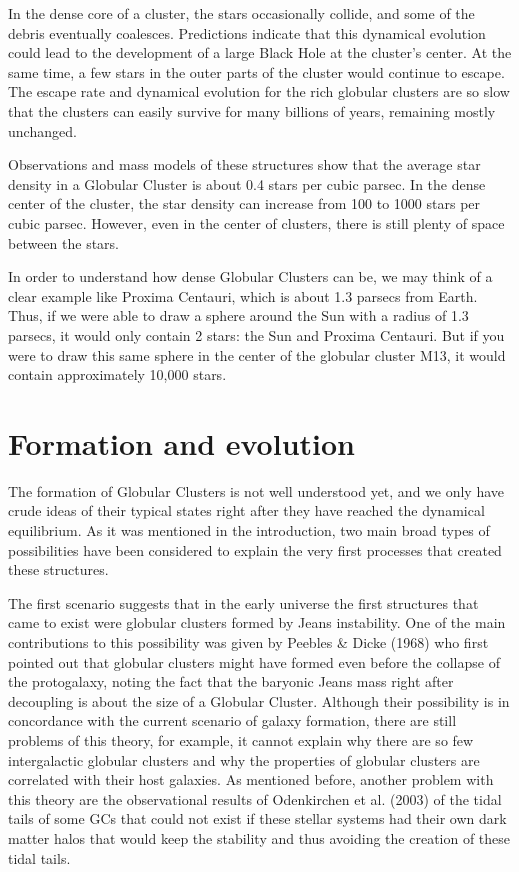 In the dense core of a cluster, the stars occasionally collide, and some of the debris eventually coalesces. Predictions indicate that this dynamical evolution could lead to the development of a large Black Hole at the cluster's center. At the same time, a few stars in the outer parts of the cluster would continue to escape. The escape rate and dynamical evolution for the rich globular clusters are so slow that the clusters can easily survive for many billions of years, remaining mostly unchanged.

Observations and mass models of these structures show that the average star density in a Globular Cluster is about 0.4 stars per cubic parsec. In the dense center of the cluster, the star density can increase from 100 to 1000 stars per cubic parsec. However, even in the center of clusters, there is still plenty of space between the stars.

In order to understand how dense Globular Clusters can be, we may think of a clear example like Proxima Centauri, which is about 1.3 parsecs from Earth. Thus, if we were able to draw a sphere around the Sun with a radius of 1.3 parsecs, it would only contain 2 stars: the Sun and Proxima Centauri. But if you were to draw this same sphere in the center of the globular cluster M13, it would contain approximately 10,000 stars.

\section{Formation and evolution}

The formation of Globular Clusters is not well understood yet, and we only have crude ideas of their typical states right after they have reached the dynamical equilibrium. As it was mentioned in the introduction, two main broad types of possibilities have been considered to explain the very first processes that created these structures. 

The first scenario suggests that in the early universe the first structures that came to exist were globular clusters formed by Jeans instability. One of the main contributions to this possibility was given by Peebles \& Dicke (1968) who first pointed out that globular clusters might have formed even before the collapse of the protogalaxy, noting the fact that the baryonic Jeans mass right after decoupling is about the size of a Globular Cluster. Although their possibility is in concordance with the current scenario of galaxy formation, there are still problems of this theory, for example, it cannot explain why there are so few intergalactic globular clusters and why the properties of globular clusters are correlated with their host galaxies. As mentioned before, another problem with this theory are the observational results of Odenkirchen et al. (2003) of the tidal tails of some GCs that could not exist if these stellar systems had their own dark matter halos that would keep the stability and thus avoiding the creation of these tidal tails.

